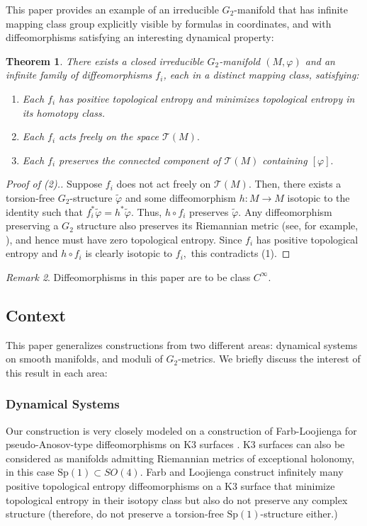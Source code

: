 \documentclass{amsart}
\theoremstyle{theorem}
\newtheorem{theorem}{Theorem}[section]
\theoremstyle{definition}
\theoremstyle{definition}
\theoremstyle{definition}
\theoremstyle{theorem}
\theoremstyle{theorem}
\theoremstyle{theorem}
\theoremstyle{corollary}
\theoremstyle{question}
\theoremstyle{remark}
\newtheorem{remark}[theorem]{Remark}
\begin{document}
This paper provides an example of an irreducible $G_2$-manifold that has infinite mapping class group explicitly visible by formulas in coordinates, and with diffeomorphisms satisfying an interesting dynamical property:

\begin{theorem}
    There exists a closed irreducible $G_2$-manifold $(M, \varphi)$ and an infinite family of diffeomorphisms $f_i$, each in a distinct mapping class, satisfying: \begin{enumerate}
        \item Each $f_i$ has positive topological entropy and minimizes topological entropy in its homotopy class.
        \item Each $f_i$ acts freely on the space $\mathcal{T}(M).$
        \item Each $f_i$ preserves the connected component of $\mathcal{T}(M)$ containing $[\varphi].$
    \end{enumerate}
\end{theorem}

\begin{proof}[Proof of (2).]
    Suppose $f_i$ does not act freely on $\mathcal{T}(M).$ Then, there exists a torsion-free $G_2$-structure $\widetilde\varphi$ and some diffeomorphism $h: M\to M$ isotopic to the identity such that $f_i^*\widetilde\varphi = h^*\widetilde\varphi.$ Thus, $h\circ f_i$ preserves $\widetilde\varphi.$ Any diffeomorphism preserving a $G_2$ structure also preserves its Riemannian metric (see, for example, \cite[Thereom 2.3.3]{Karigiannis}), and hence must have zero topological entropy. Since $f_i$ has positive topological entropy and $h\circ f_i$ is clearly isotopic to $f_i,$ this contradicts (1).
\end{proof}

\begin{remark}
    Diffeomorphisms in this paper are to be class $C^\infty.$
\end{remark}

\subsection{Context}

This paper generalizes constructions from two different areas: dynamical systems on smooth manifolds, and moduli of $G_2$-metrics. We briefly discuss the interest of this result in each area:

\subsubsection{Dynamical Systems} Our construction is very closely modeled on a construction of Farb-Loojienga for pseudo-Anosov-type diffeomorphisms on K3 surfaces \cite{FL}. K3 surfaces can also be considered as manifolds admitting Riemannian metrics of exceptional holonomy, in this case $\text{Sp}(1)\subset SO(4)$. Farb and Loojienga construct infinitely many positive topological entropy diffeomorphisms on a K3 surface that minimize topological entropy in their isotopy class but also do not preserve any complex structure (therefore, do not preserve a torsion-free $\text{Sp}(1)$-structure either.)
\end{document}
